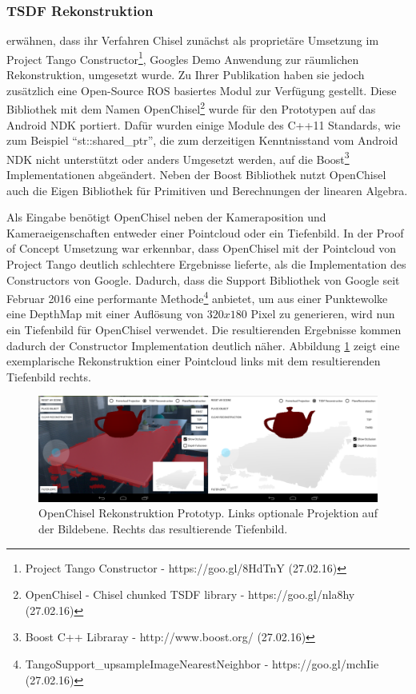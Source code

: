 \subsubsection*{TSDF Rekonstruktion}

\citet{Klingensmith_2015_7924} erwähnen, dass ihr Verfahren Chisel zunächst als proprietäre Umsetzung im Project Tango Constructor\footnote{Project Tango Constructor - https://goo.gl/8HdTnY (27.02.16)}, Googles Demo Anwendung zur räumlichen Rekonstruktion, umgesetzt wurde. Zu Ihrer Publikation haben sie jedoch zusätzlich eine Open-Source ROS basiertes Modul zur Verfügung gestellt. Diese Bibliothek mit dem Namen OpenChisel\footnote{OpenChisel - Chisel chunked TSDF library - https://goo.gl/nla8hy (27.02.16)} wurde für den Prototypen auf das Android NDK portiert. Dafür wurden einige Module des C++11 Standards, wie zum Beispiel \enquote{st::shared\_ptr}, die zum derzeitigen Kenntnisstand vom Android NDK nicht unterstützt oder anders Umgesetzt werden, auf die Boost\footnote{Boost C++ Libraray - http://www.boost.org/ (27.02.16)} Implementationen abgeändert. Neben der Boost Bibliothek nutzt OpenChisel auch die Eigen Bibliothek für Primitiven und Berechnungen der linearen Algebra.

Als Eingabe benötigt OpenChisel neben der Kameraposition und Kameraeigenschaften entweder einer Pointcloud oder ein Tiefenbild. In der Proof of Concept Umsetzung war erkennbar, dass OpenChisel mit der Pointcloud von Project Tango deutlich schlechtere Ergebnisse lieferte, als die Implementation des Constructors von Google. Dadurch, dass die Support Bibliothek von Google seit Februar 2016 eine performante Methode\footnote{TangoSupport\_upsampleImageNearestNeighbor - https://goo.gl/mchIie (27.02.16)} anbietet, um aus einer Punktewolke eine DepthMap mit einer Auflösung von \(320x180\) Pixel zu generieren, wird nun ein Tiefenbild für OpenChisel verwendet. Die resultierenden Ergebnisse kommen dadurch der Constructor Implementation deutlich näher. Abbildung \ref{fig:chisel-demo} zeigt eine exemplarische Rekonstruktion einer Pointcloud links mit dem resultierenden Tiefenbild rechts.

\begin{figure}[h]
  \centering
	\includegraphics[width=1.0\textwidth]{content/images/implementation/chisel-demo.png} 
  \caption{OpenChisel Rekonstruktion Prototyp. Links optionale Projektion auf der Bildebene. Rechts das resultierende Tiefenbild.}
  \label{fig:chisel-demo}
\end{figure}
